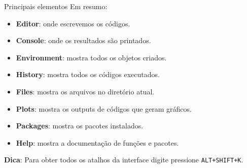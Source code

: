 \documentclass[
  ignorenonframetext,
  serif,
  professionalfont,
  usenames,
  dvipsnames,
  aspectratio = 169]{beamer}
\providecommand{\tightlist}{%
  \setlength{\itemsep}{0pt}\setlength{\parskip}{0pt}}
\renewcommand{\tightlist}{%
  \setlength{\itemsep}{0\baselineskip}
  \setlength{\parskip}{0.25\baselineskip}
}
\begin{document}
\begin{frame}[fragile]{Principais elementos}
\protect\hypertarget{principais-elementos}{}
Em resumo:

\begin{itemize}
\tightlist
\item
  \textbf{Editor}: onde escrevemos os códigos.
\item
  \textbf{Console}: onde os resultados são printados.
\item
  \textbf{Environment}: mostra todos os objetos criados.
\item
  \textbf{History}: mostra todos os códigos executados.
\item
  \textbf{Files}: mostra os arquivos no diretório atual.
\item
  \textbf{Plots}: mostra os outputs de códigos que geram gráficos.
\item
  \textbf{Packages}: mostra os pacotes instalados.
\item
  \textbf{Help}: mostra a documentação de funções e pacotes.
\end{itemize}

\textbf{Dica}: Para obter todos os atalhos da interface digite pressione
\texttt{ALT+SHIFT+K}.
\end{frame}
\end{document}
